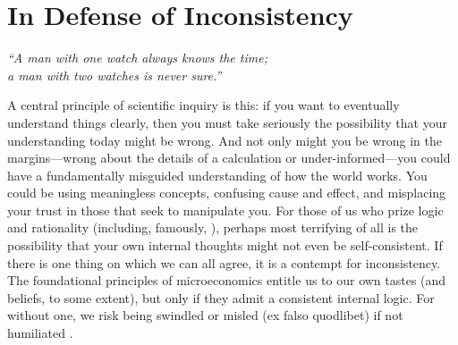 

\section{In Defense of Inconsistency}
    \label{sec:defend-inconsist}

\begin{center}
    \noindent\singlespacingplus
    \it
    ``A man with one watch always knows the time;\\
    a man with two watches is never sure.'' \\
    \citep{segal-law}
\end{center}

%
A central principle of scientific inquiry is this:
    if you want to eventually understand things clearly, then you must take seriously the possibility that your understanding today might be wrong. 
And not only might you be wrong in the margins---wrong about the details of a calculation or under-informed---you could have a fundamentally misguided understanding of how the world works. You could be using meaningless concepts, confusing cause and effect, and misplacing your trust in those that seek to manipulate you. 
For those of us who prize logic and rationality (including, famously, 
\citet{descartes}),
perhaps most terrifying of all is the possibility that your own internal thoughts might not even be self-consistent.
If there is one thing on which we can all agree, it is a contempt for inconsistency.
The foundational principles of microeconomics entitle us to our own tastes (and beliefs, to some extent), but only if they admit a consistent internal logic.
For without one, we risk being swindled \citep{sep-dutch-book} or misled 
(ex falso quodlibet)
if not humiliated \citep{finocchiaro1981fallacies,russell1902letter}.



